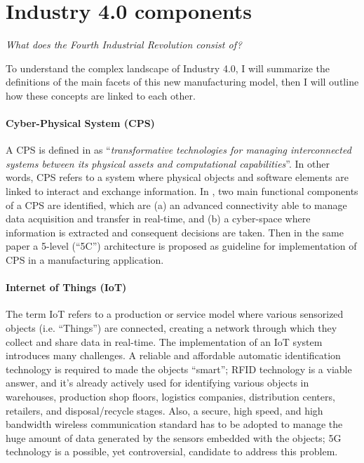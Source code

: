 \section{Industry 4.0 components}
\label{Industry 4.0 components}
\begin{center}
\textit{What does the Fourth Industrial Revolution consist of?}
\end{center}
To understand the complex landscape of Industry 4.0, I will summarize the definitions of the main facets of this new manufacturing model, then I will outline how these concepts are linked to each other.
\paragraph{Cyber-Physical System (CPS)}
A CPS is defined in \cite{LeeJay2015ACSa} as “\textit{transformative technologies for managing interconnected systems between its physical assets and computational capabilities}”. In other words, CPS refers to a system where physical objects and software elements are linked to interact and exchange information. 
In \cite{LeeJay2015ACSa}, two main functional components of a CPS are identified, which are (a) an advanced connectivity able to manage data acquisition and transfer in real-time, and (b) a cyber-space where information is extracted and consequent decisions are taken. Then in the same paper a 5-level (“5C”) architecture is proposed as guideline for implementation of CPS in a manufacturing application. 
\paragraph{Internet of Things (IoT)}
The term IoT refers to a production or service model where various sensorized objects (i.e. “Things”) are connected, creating a network through which they collect and share data in real-time. The implementation of an IoT system introduces many challenges. A reliable and affordable automatic identification technology is required to made the objects “smart”; RFID technology is a viable answer, and it’s already actively used for identifying various objects in warehouses, production shop floors, logistics companies, distribution centers, retailers, and disposal/recycle stages. Also, a secure, high speed, and high bandwidth wireless communication standard has to be adopted to manage the huge amount of data generated by the sensors embedded with the objects; 5G technology is a possible, yet controversial, candidate to address this problem.
